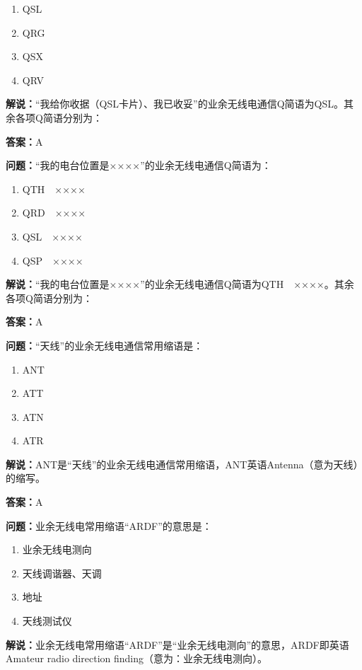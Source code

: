 \documentclass[UTF8]{ctexbook}
\begin{document}
\begin{enumerate}[label=\Alph*), leftmargin=3em]
  \item QSL
  \item QRG
  \item QSX
  \item QRV
\end{enumerate}

\textbf{解说：}“我给你收据（QSL卡片）、我已收妥”的业余无线电通信Q简语为QSL。其余各项Q简语分别为：

\textbf{答案：}A

\textbf{问题：}“我的电台位置是××××”的业余无线电通信Q简语为：

\begin{enumerate}[label=\Alph*), leftmargin=3em]
  \item QTH　××××
  \item QRD　××××
  \item QSL　××××
  \item QSP　××××
\end{enumerate}

\textbf{解说：}“我的电台位置是××××”的业余无线电通信Q简语为QTH　××××。其余各项Q简语分别为：

\textbf{答案：}A

\textbf{问题：}“天线”的业余无线电通信常用缩语是：

\begin{enumerate}[label=\Alph*), leftmargin=3em]
  \item ANT
  \item ATT
  \item ATN
  \item ATR
\end{enumerate}

\textbf{解说：}ANT是“天线”的业余无线电通信常用缩语，ANT英语Antenna（意为天线）的缩写。

\textbf{答案：}A

\textbf{问题：}业余无线电常用缩语“ARDF”的意思是：

\begin{enumerate}[label=\Alph*), leftmargin=3em]
  \item 业余无线电测向
  \item 天线调谐器、天调
  \item 地址
  \item 天线测试仪
\end{enumerate}

\textbf{解说：}业余无线电常用缩语“ARDF”是“业余无线电测向”的意思，ARDF即英语Amateur radio direction finding（意为：业余无线电测向）。
\end{document}
